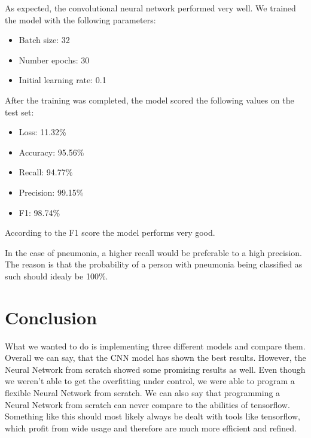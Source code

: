 \documentclass{article}
\begin{document}
As expected, the convolutional neural network performed very well.
We trained the model with the following parameters:
\begin{itemize}
  \item Batch size: 32
  \item Number epochs: 30
  \item Initial learning rate: 0.1
\end{itemize}

After the training was completed, the model scored the following values on the test set:

\begin{itemize}
  \item Loss: 11.32\%
  \item Accuracy: 95.56\%
  \item Recall: 94.77\%
  \item Precision: 99.15\%
  \item F1: 98.74\%
\end{itemize}

According to the F1 score the model performs very good. 

In the case of pneumonia, a higher recall would be preferable to a high precision. 
The reason is that the probability of a person with pneumonia being classified as such should idealy be 100\%.

\section{Conclusion}

What we wanted to do is implementing three different models and compare them.
Overall we can say, that the CNN model has shown the best results. However, the Neural Network from scratch showed some promising results as well. 
Even though we weren't able to get the overfitting under control, we were able to program a flexible Neural Network from scratch.
We can also say that programming a Neural Network from scratch can never compare to the abilities of tensorflow. 
Something like this should most likely always be dealt with tools like tensorflow, which profit from wide usage and therefore are much more efficient and refined.
\end{document}
